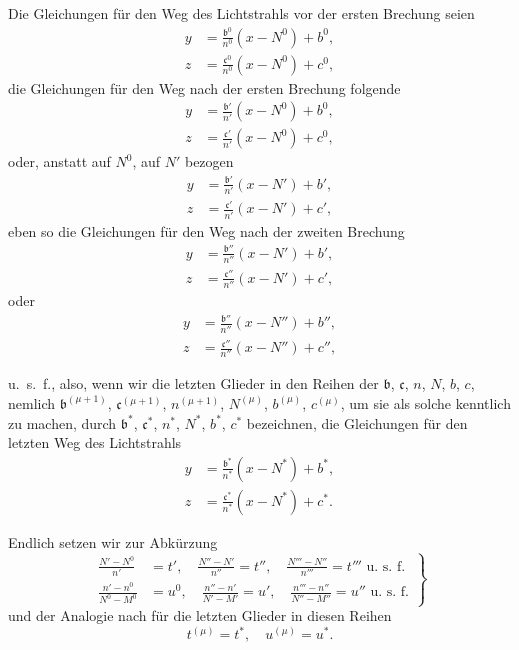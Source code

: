 \documentclass[11pt,a4paper]{article}
\begin{document}
Die Gleichungen für den Weg des Lichtstrahls vor der ersten Brechung seien
\begin{align*}
y &= \tfrac{\mathfrak{b}^0}{n^0}(x - N^0) + b^0, \\
z &= \tfrac{\mathfrak{c}^0}{n^0}(x - N^0) + c^0,
\end{align*}
die Gleichungen für den Weg nach der ersten Brechung folgende
\begin{align*}
y &= \tfrac{\mathfrak{b}'}{n'}(x - N^0) + b^0, \\
z &= \tfrac{\mathfrak{c}'}{n'}(x - N^0) + c^0,
\end{align*}
oder, anstatt auf $N^0$, auf $N'$ bezogen
\begin{align*}
y &= \tfrac{\mathfrak{b}'}{n'}(x - N') + b', \\
z &= \tfrac{\mathfrak{c}'}{n'}(x - N') + c',
\end{align*}
eben so die Gleichungen für den Weg nach der zweiten Brechung
\begin{align*}
y &= \tfrac{\mathfrak{b}''}{n''}(x - N') + b', \\
z &= \tfrac{\mathfrak{c}''}{n''}(x - N') + c',
\end{align*}
oder
\begin{align*}
y &= \tfrac{\mathfrak{b}''}{n''}(x - N'') + b'', \\
z &= \tfrac{\mathfrak{c}''}{n''}(x - N'') + c'',
\end{align*}

\newpage
\noindent
u.~s.~f., also, wenn wir die letzten Glieder in den Reihen der $\mathfrak{b}$, $\mathfrak{c}$, $n$, $N$, $b$, $c$, nemlich $\mathfrak{b}^{(\mu+1)}$, $\mathfrak{c}^{(\mu+1)}$, $n^{(\mu+1)}$, $N^{(\mu)}$, $b^{(\mu)}$, $c^{(\mu)}$, um sie als solche kenntlich zu machen, durch $\mathfrak{b}^*$, $\mathfrak{c}^*$, $n^*$, $N^*$, $b^*$, $c^*$ bezeichnen, die Gleichungen für den letzten Weg des Lichtstrahls
\begin{align*}
y &= \tfrac{\mathfrak{b}^*}{n^*}(x - N^*) + b^*, \\
z &= \tfrac{\mathfrak{c}^*}{n^*}(x - N^*) + c^*.
\end{align*}

Endlich setzen wir zur Abkürzung
\[
\left.
\begin{aligned}
\tfrac{N' - N^0}{n'} &= t', \quad \tfrac{N'' - N'}{n''} = t'', \quad \tfrac{N''' - N''}{n'''} = t''' \text{ u.~s.~f.} \\
\tfrac{n' - n^0}{N^0 - M^0} &= u^0, \quad \tfrac{n'' - n'}{N' - M'} = u', \quad \tfrac{n''' - n''}{N'' - M''} = u'' \text{ u.~s.~f.}
\end{aligned}
\right\}
\tag{3}
\]
und der Analogie nach für die letzten Glieder in diesen Reihen
\[
t^{(\mu)} = t^*, \quad u^{(\mu)} = u^*.
\]
\end{document}
